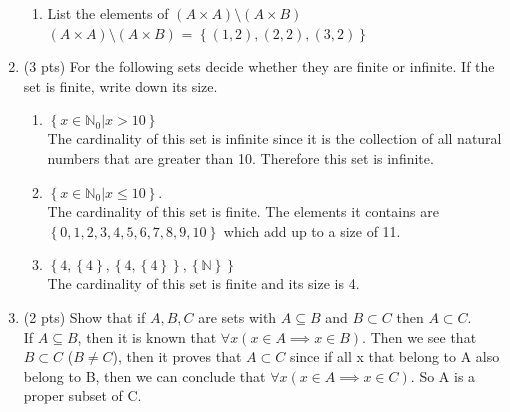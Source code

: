 \documentclass[12pt]{article}
\newcommand{\set}[1]{\left\{ #1 \right\}}
\newcommand{\nn}{\ensuremath{\mathbb{N}}}
\begin{document}
\begin{enumerate}
\begin{enumerate}
\item  List the elements of \((A \times A) \setminus (A \times B)\)
\\\((A \times A) \setminus (A \times B)\) = $\set{(1,2),(2,2),(3,2)}$\\
\end{enumerate}

\cleardoublepage
\item (3 pts) For the following sets decide whether they are finite or infinite. If the set is finite, write down its size.
\begin{enumerate}
	\item $\set{x\in\nn_0\vert x>10}$
    \\The cardinality of this set is infinite since it is the collection of all natural numbers that are greater than 10. Therefore this set is infinite.
    \\
	\item $\set{x\in\nn_0\vert x\leq 10}$.
    \\The cardinality of this set is finite. The elements it contains are
    $\set{0,1,2,3,4,5,6,7,8,9,10}$ which add up to a size of 11.
    \\
	\item $\set{4,\set{4},\set{4,\set{4}}, \set{\nn}}$
    \\The cardinality of this set is finite and its size is 4.\\

\end{enumerate}

\item (2 pts) Show that if $A,B,C$ are sets with $A\subseteq B$ and $B\subset C$ then $A\subset C$.
    \\If $A\subseteq B$, then it is known that $\forall x(x \in A \implies x \in B)$. Then we see that $B\subset C$ ($B \neq C$), then it proves that $A\subset C$ since if all x that belong to A also belong to B, then we can conclude that $\forall x(x \in A \implies x \in C)$. So A is a proper subset of C.


\end{enumerate}
\end{document}
